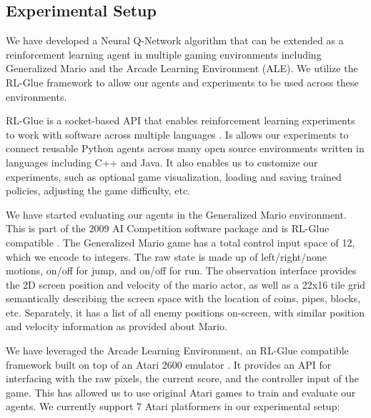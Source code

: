 \documentclass{article}
\begin{document}
\subsection{Experimental Setup}

We have developed a Neural Q-Network algorithm that can be extended as a reinforcement learning agent in multiple gaming environments including Generalized Mario and the Arcade Learning Environment (ALE). We utilize the RL-Glue framework to allow our agents and experiments to be used across these environments.

RL-Glue is a socket-based API that enables reinforcement learning experiments to work with software across multiple languages \cite{Tanner09}. Is allows our experiments to connect reusable Python agents across many open source environments written in languages including C++ and Java. It also enables us to customize our experiments, such as optional game visualization, loading and saving trained policies, adjusting the game difficulty, etc.

We have started evaluating our agents in the Generalized Mario environment. This is part of the 2009 AI Competition software package and is RL-Glue compatible \cite{Togelius10}. The Generalized Mario game has a total control input space of 12, which we encode to integers. The raw state is made up of left/right/none motions, on/off for jump, and on/off for run. The observation interface provides the 2D screen position and velocity of the mario actor, as well as a 22x16 tile grid semantically describing the screen space with the location of coins, pipes, blocks, etc. Separately, it has a list of all enemy positions on-screen, with similar position and velocity information as provided about Mario. 

We have leveraged the Arcade Learning Environment, an RL-Glue compatible framework built on top of an Atari 2600 emulator \cite{bellemare13}.  It provides an API for interfacing with the raw pixels, the current score, and the controller input of the game. This has allowed us to use original Atari games to train and evaluate our agents. We currently support 7 Atari platformers in our experimental setup:

\end{document}
